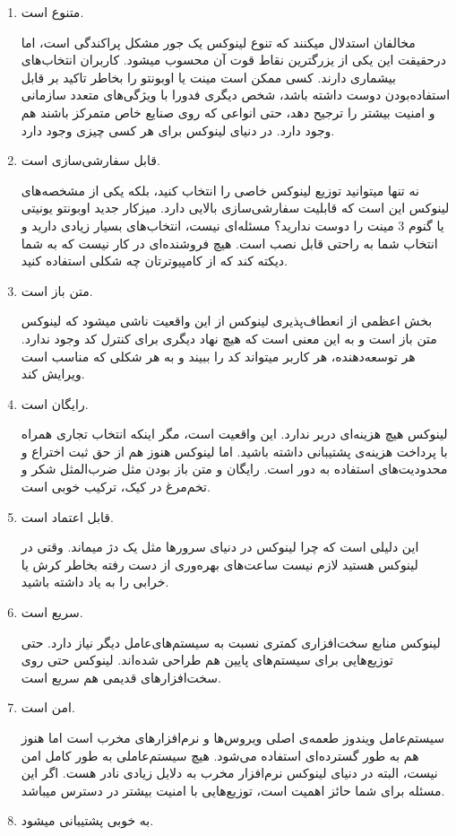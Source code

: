 \begin{enumerate}
\item متنوع است.

مخالفان استدلال میکنند که تنوع لینوکس یک جور مشکل پراکندگی است، اما درحقیقت این یکی از یزرگترین نقاط قوت آن محسوب میشود. کاربران انتخاب‌های بیشماری دارند. کسی ممکن است مینت یا اوبونتو را بخاطر تاکید بر قابل استفاده‌بودن دوست داشته باشد، شخص دیگری فدورا با ویژگی‌های متعدد سازمانی و امنیت بیشتر را ترجیح دهد، حتی انواعی که روی صنایع خاص متمرکز باشند هم وجود دارد. در دنیای لینوکس برای هر کسی چیزی وجود دارد.

\item قابل سفارشی‌سازی است.

نه تنها میتوانید توزیع لینوکس خاصی را انتخاب کنید، بلکه یکی از مشخصه‌های لینوکس این است که قابلیت سفارشی‌سازی بالایی دارد. میزکار جدید اوبونتو یونیتی یا گنوم 3 مینت را دوست ندارید؟ مسئله‌ای نیست، انتخاب‌های بسیار زیادی دارید و انتخاب شما به راحتی قابل نصب است. هیچ فروشنده‌ای در کار نیست که به شما دیکته کند که از کامپیوترتان چه شکلی استفاده کنید.
\item متن باز است.

بخش اعظمی از انعطاف‌پذیری لینوکس از این واقعیت ناشی میشود که لینوکس متن باز است و به این معنی است که هیچ نهاد دیگری برای کنترل کد وجود ندارد. هر توسعه‌دهنده، هر کاربر میتواند کد را ببیند و به هر شکلی که مناسب است ویرایش کند.
\item  رایگان است.

لینوکس هیچ هزینه‌ای دربر ندارد. این واقعیت است، مگر اینکه انتخاب تجاری همراه با پرداخت هزینه‌ی پشتیبانی داشته باشید. اما لینوکس هنوز هم از حق ثبت اختراع و محدودیت‌های استفاده به دور است. رایگان و متن باز بودن مثل ضرب‌المثل شکر و تخم‌مرغ در کیک، ترکیب خوبی است.
\item  قابل اعتماد است.

این دلیلی است که چرا لینوکس در دنیای سرورها مثل یک دژ میماند. وقتی در لینوکس هستید لازم نیست ساعت‌های بهره‌وری از دست رفته بخاطر کرش یا خرابی را به یاد داشته باشید.
\item  سریع است.

لینوکس منابع سخت‌افزاری کمتری نسبت به سیستم‌های‌عامل دیگر نیاز دارد. حتی توزیع‌هایی برای سیستم‌های پایین هم طراحی شده‌اند. لینوکس حتی روی سخت‌افزارهای قدیمی هم سریع است.
\item  امن است.

سیستم‌عامل ویندوز طعمه‌ی اصلی ویروس‌ها و نرم‌افزارهای مخرب است اما هنوز هم به طور گسترده‌ای استفاده می‌شود. هیچ سیستم‌عاملی به طور کامل امن نیست، البته در دنیای لینوکس نرم‌افزار مخرب به دلایل زیادی نادر هست. اگر این مسئله برای شما حائز اهمیت است، توزیع‌هایی با امنیت بیشتر در دسترس میباشد.
\item  به خوبی پشتیبانی میشود.


\end{enumerate}
